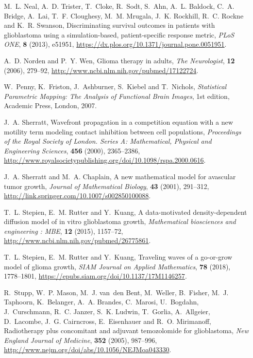 \documentclass{aims}
\numberwithin{equation}{section}
\begin{document}
\begin{thebibliography}{10}
\newblock M.~L. Neal, A.~D. Trister, T.~Cloke, R.~Sodt, S.~Ahn, A.~L. Baldock,
  C.~A. Bridge, A.~Lai, T.~F. Cloughesy, M.~M. Mrugala, J.~K. Rockhill, R.~C.
  Rockne and K.~R. Swanson,
\newblock Discriminating survival outcomes in patients with glioblastoma using
  a simulation-based, patient-specific response metric,
\newblock \emph{PLoS ONE}, \textbf{8} (2013), e51951,
\newblock \urlprefix\url{https://dx.plos.org/10.1371/journal.pone.0051951}.

\newblock A.~D. Norden and P.~Y. Wen,
\newblock Glioma therapy in adults,
\newblock \emph{The Neurologist}, \textbf{12} (2006), 279--92,
\newblock \urlprefix\url{http://www.ncbi.nlm.nih.gov/pubmed/17122724}.

\newblock W.~Penny, K.~Friston, J.~Ashburner, S.~Kiebel and T.~Nichols,
\newblock \emph{Statistical Parametric Mapping: The Analysis of Functional
  Brain Images},
\newblock 1st edition,
\newblock Academic Press, London, 2007.

\newblock J.~A. Sherratt,
\newblock Wavefront propagation in a competition equation with a new motility
  term modeling contact inhibition between cell populations,
\newblock \emph{Proceedings of the Royal Society of London. Series A:
  Mathematical, Physical and Engineering Sciences}, \textbf{456} (2000),
  2365--2386,
\newblock
  \urlprefix\url{http://www.royalsocietypublishing.org/doi/10.1098/rspa.2000.0616}.

\newblock J.~A. Sherratt and M.~A. Chaplain,
\newblock A new mathematical model for avascular tumor growth,
\newblock \emph{Journal of Mathematical Biology}, \textbf{43} (2001), 291--312,
\newblock \urlprefix\url{http://link.springer.com/10.1007/s002850100088}.

\newblock T.~L. Stepien, E.~M. Rutter and Y.~Kuang,
\newblock A data-motivated density-dependent diffusion model of in vitro
  glioblastoma growth,
\newblock \emph{Mathematical biosciences and engineering : MBE}, \textbf{12}
  (2015), 1157--72,
\newblock \urlprefix\url{http://www.ncbi.nlm.nih.gov/pubmed/26775861}.

\newblock T.~L. Stepien, E.~M. Rutter and Y.~Kuang,
\newblock Traveling waves of a go-or-grow model of glioma growth,
\newblock \emph{SIAM Journal on Applied Mathematics}, \textbf{78} (2018),
  1778--1801,
\newblock \urlprefix\url{https://epubs.siam.org/doi/10.1137/17M1146257}.

\newblock R.~Stupp, W.~P. Mason, M.~J. van~den Bent, M.~Weller, B.~Fisher,
  M.~J. Taphoorn, K.~Belanger, A.~A. Brandes, C.~Marosi, U.~Bogdahn,
  J.~Curschmann, R.~C. Janzer, S.~K. Ludwin, T.~Gorlia, A.~Allgeier,
  D.~Lacombe, J.~G. Cairncross, E.~Eisenhauer and R.~O. Mirimanoff,
\newblock Radiotherapy plus concomitant and adjuvant temozolomide for
  glioblastoma,
\newblock \emph{New England Journal of Medicine}, \textbf{352} (2005),
  987--996,
\newblock \urlprefix\url{http://www.nejm.org/doi/abs/10.1056/NEJMoa043330}.


\end{thebibliography}
\end{document}
